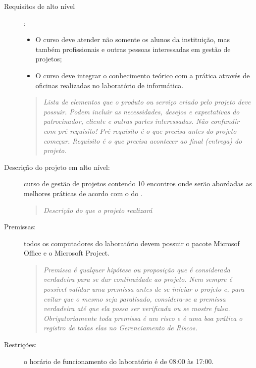 \begin{description}
	\item[Requisitos de alto nível] : 
	
		\begin{itemize}
			
			\item O curso deve atender não somente os alunos da instituição, mas também profissionais e outras pessoas interessadas em gestão de projetos;
			
			\item O curso deve integrar o conhecimento teórico com a prática através de oficinas realizadas no laboratório de informática.
			
		\end{itemize}
		
	\begin{quote}
		\emph{Lista de elementos que o produto ou serviço criado pelo projeto deve possuir. Podem incluir as necessidades, desejos e expectativas do patrocinador, cliente e outras partes interessadas. Não confundir com pré-requisito! Pré-requisito é o que precisa antes do projeto começar. Requisito é o que precisa acontecer ao final (entrega) do projeto.}
	\end{quote}
	

	\item[Descrição do projeto em alto nível:] curso de gestão de projetos contendo 10 encontros onde serão abordadas as melhores práticas de acordo com o \bok do \pmi.

	\begin{quote}
		\emph{Descrição do que o projeto realizará}
	\end{quote}

	\item[Premissas: ] todos os computadores do laboratório devem possuir o pacote Microsof Office e o Microsoft Project.
	
	\begin{quote}
		\emph{Premissa é qualquer hipótese ou proposição que é considerada verdadeira para se dar continuidade ao projeto. Nem sempre é possível validar uma premissa antes de se iniciar o projeto e, para evitar que o mesmo seja paralisado, considera-se a premissa verdadeira até que ela possa ser verificada ou se mostre falsa. Obrigatoriamente toda premissa é um risco e é uma boa prática o registro de todas elas no Gerenciamento de Riscos.}
	\end{quote}

	\item[Restrições: ] o horário de funcionamento do laboratório é de 08:00 às 17:00.
	

\end{description}
